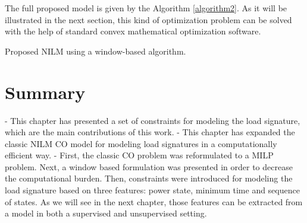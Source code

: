 The full proposed model is given by the Algorithm \ref{algorithm2}. As it will be illustrated in the next section, this kind of optimization problem can be solved with the help of standard convex mathematical optimization software. 

\begin{algorithm}[H]\label{algorithm2}
\SetAlgoLined
\caption{Proposed NILM using a window-based algorithm.}
\end{algorithm}

\vfill


\section{Summary}
- This chapter has presented a set of constraints for modeling the load signature, which are the main contributions of this work. 
- This chapter has expanded the classic NILM CO model for modeling load signatures in a computationally efficient way. 
- First, the classic CO problem was reformulated to a MILP problem. Next, a window based formulation was presented in order to decrease the computational burden. Then, constraints were introduced for modeling the load signature based on three features: power state, minimum time and sequence of states. As we will see in the next chapter, those features can be extracted from a model in both a supervised and unsupervised setting. 